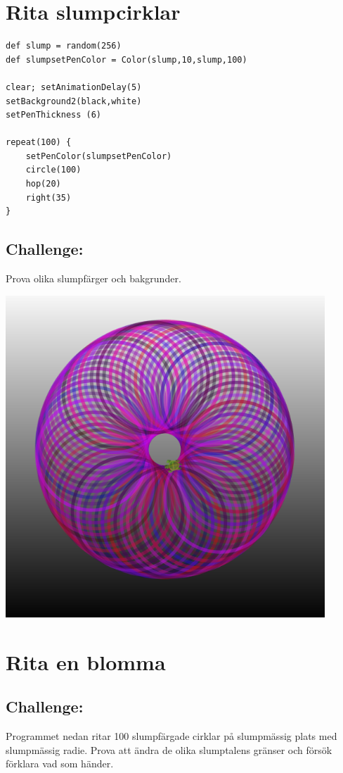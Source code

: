 \chapter{Rita slumpcirklar}
\begin{multicols}{2}

\begin{lstlisting}[basicstyle={\ttfamily\fontsize{16}{19}\selectfont},numbers=none]
def slump = random(256)
def slumpsetPenColor = Color(slump,10,slump,100) 

clear; setAnimationDelay(5)
setBackground2(black,white)
setPenThickness (6)

repeat(100) {
    setPenColor(slumpsetPenColor)
    circle(100)
    hop(20)
    right(35)
}
\end{lstlisting}
        
\section*{\color{BrickRed}Challenge:}
Prova olika slumpfärger och bakgrunder.


\columnbreak


\begin{center}
\includegraphics[width=12.0cm]{../img/circle-of-circles.png}
\end{center}

\end{multicols}

\chapter{Rita en blomma}\section*{\color{BrickRed}Challenge:}
Programmet nedan ritar 100 slumpfärgade cirklar på slumpmässig plats med slumpmässig radie. Prova att ändra de olika slumptalens gränser och försök förklara vad som händer.

